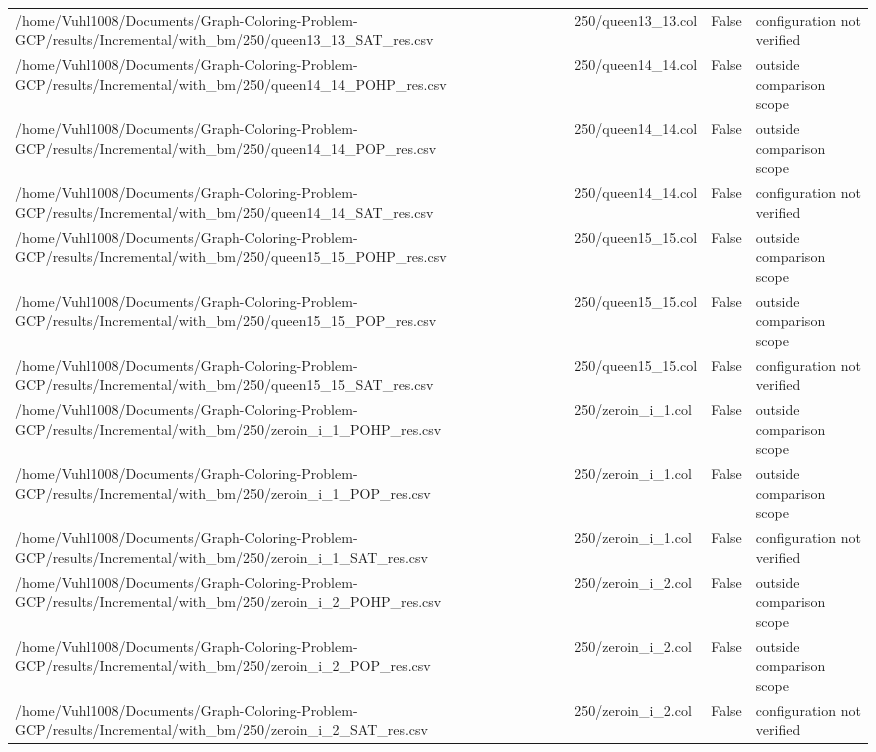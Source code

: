 \begin{table}[htbp]
\begin{tabular}{llll}
/home/Vuhl1008/Documents/Graph-Coloring-Problem-GCP/results/Incremental/with\_bm/250/queen13\_13\_SAT\_res.csv & 250/queen13\_13.col & False & configuration not verified \\
/home/Vuhl1008/Documents/Graph-Coloring-Problem-GCP/results/Incremental/with\_bm/250/queen14\_14\_POHP\_res.csv & 250/queen14\_14.col & False & outside comparison scope \\
/home/Vuhl1008/Documents/Graph-Coloring-Problem-GCP/results/Incremental/with\_bm/250/queen14\_14\_POP\_res.csv & 250/queen14\_14.col & False & outside comparison scope \\
/home/Vuhl1008/Documents/Graph-Coloring-Problem-GCP/results/Incremental/with\_bm/250/queen14\_14\_SAT\_res.csv & 250/queen14\_14.col & False & configuration not verified \\
/home/Vuhl1008/Documents/Graph-Coloring-Problem-GCP/results/Incremental/with\_bm/250/queen15\_15\_POHP\_res.csv & 250/queen15\_15.col & False & outside comparison scope \\
/home/Vuhl1008/Documents/Graph-Coloring-Problem-GCP/results/Incremental/with\_bm/250/queen15\_15\_POP\_res.csv & 250/queen15\_15.col & False & outside comparison scope \\
/home/Vuhl1008/Documents/Graph-Coloring-Problem-GCP/results/Incremental/with\_bm/250/queen15\_15\_SAT\_res.csv & 250/queen15\_15.col & False & configuration not verified \\
/home/Vuhl1008/Documents/Graph-Coloring-Problem-GCP/results/Incremental/with\_bm/250/zeroin\_i\_1\_POHP\_res.csv & 250/zeroin\_i\_1.col & False & outside comparison scope \\
/home/Vuhl1008/Documents/Graph-Coloring-Problem-GCP/results/Incremental/with\_bm/250/zeroin\_i\_1\_POP\_res.csv & 250/zeroin\_i\_1.col & False & outside comparison scope \\
/home/Vuhl1008/Documents/Graph-Coloring-Problem-GCP/results/Incremental/with\_bm/250/zeroin\_i\_1\_SAT\_res.csv & 250/zeroin\_i\_1.col & False & configuration not verified \\
/home/Vuhl1008/Documents/Graph-Coloring-Problem-GCP/results/Incremental/with\_bm/250/zeroin\_i\_2\_POHP\_res.csv & 250/zeroin\_i\_2.col & False & outside comparison scope \\
/home/Vuhl1008/Documents/Graph-Coloring-Problem-GCP/results/Incremental/with\_bm/250/zeroin\_i\_2\_POP\_res.csv & 250/zeroin\_i\_2.col & False & outside comparison scope \\
/home/Vuhl1008/Documents/Graph-Coloring-Problem-GCP/results/Incremental/with\_bm/250/zeroin\_i\_2\_SAT\_res.csv & 250/zeroin\_i\_2.col & False & configuration not verified \\

\end{tabular}
\end{table}
